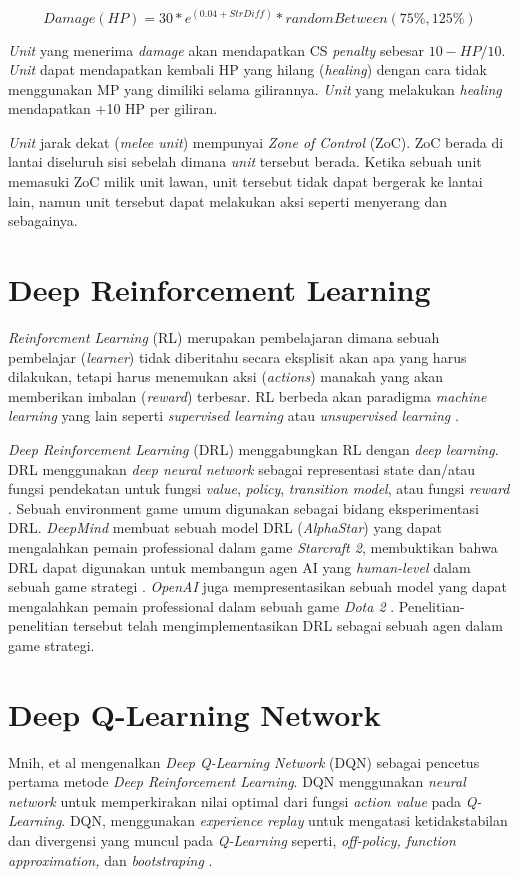 \[Damage(HP) = 30 * e^{(0.04+StrDiff)} * randomBetween(75\%, 125\%)\]

\emph{Unit} yang menerima \emph{damage} akan mendapatkan CS \emph{penalty} sebesar \(10 - HP/10\).
\emph{Unit} dapat mendapatkan kembali HP yang hilang (\emph{healing}) dengan cara tidak menggunakan MP yang dimiliki selama gilirannya.
\emph{Unit} yang melakukan \emph{healing} mendapatkan +10 HP per giliran.

\emph{Unit} jarak dekat (\emph{melee unit})  mempunyai \emph{Zone of Control} (ZoC). ZoC berada di lantai diseluruh sisi sebelah dimana 
\emph{unit} tersebut berada. Ketika sebuah unit memasuki ZoC milik unit lawan, unit tersebut tidak dapat bergerak ke lantai lain, namun
unit tersebut dapat melakukan aksi seperti menyerang dan sebagainya.

\section{Deep Reinforcement Learning}
\emph{Reinforcment Learning} (RL) merupakan pembelajaran dimana sebuah pembelajar (\emph{learner}) tidak diberitahu
secara eksplisit akan apa yang harus dilakukan, tetapi harus menemukan aksi (\emph{actions}) 
manakah yang akan memberikan imbalan (\emph{reward}) terbesar. 
RL berbeda akan paradigma \emph{machine learning} yang lain seperti \emph{supervised learning} atau \emph{unsupervised learning} \citep{reinforcmentL}. 

\emph{Deep Reinforcement Learning} (DRL) menggabungkan RL dengan \emph{deep learning}. DRL 
menggunakan \emph{deep neural network} sebagai representasi state dan/atau fungsi pendekatan untuk fungsi \emph{value}, 
\emph{policy}, \emph{transition model}, atau fungsi \emph{reward} \citep{deepRL}.
Sebuah environment game umum digunakan sebagai bidang eksperimentasi DRL.
\emph{DeepMind} membuat sebuah model DRL (\emph{AlphaStar}) yang dapat mengalahkan pemain professional dalam game \emph{Starcraft 2}, membuktikan bahwa DRL dapat digunakan untuk membangun agen AI yang \emph{human-level} dalam sebuah game strategi \citep{alphaStar}.
\emph{OpenAI} juga mempresentasikan sebuah model yang dapat mengalahkan pemain professional dalam sebuah game \emph{Dota 2} \citep{openaiDota2}.
Penelitian-penelitian tersebut telah mengimplementasikan DRL sebagai sebuah agen dalam game strategi.

\section{Deep Q-Learning Network}
Mnih, et al mengenalkan \emph{Deep Q-Learning Network} (DQN)\citep{deepQN} sebagai pencetus pertama metode \emph{Deep Reinforcement Learning}. DQN menggunakan \emph{neural network} untuk memperkirakan nilai optimal dari fungsi \emph{action value} pada \emph{Q-Learning}.
DQN, menggunakan \emph{experience replay} untuk mengatasi ketidakstabilan dan divergensi yang muncul pada \emph{Q-Learning} seperti, \emph{off-policy, function approximation,} dan \emph{bootstraping} \citep{deepQNFunction}.

